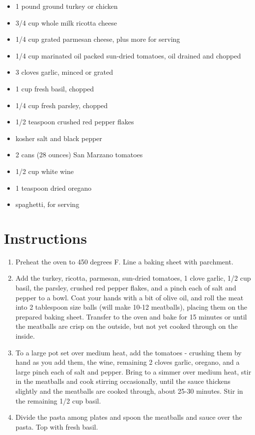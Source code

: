 \documentclass[
  letterpaper,
  DIV=11,
  numbers=noendperiod,
  titlepage=false]{scrreprt}
\providecommand{\tightlist}{%
  \setlength{\itemsep}{0pt}\setlength{\parskip}{0pt}}\usepackage{longtable,booktabs,array}
\begin{document}
\begin{itemize}
\tightlist
\item
  1 pound ground turkey or chicken
\item
  3/4 cup whole milk ricotta cheese
\item
  1/4 cup grated parmesan cheese, plus more for serving
\item
  1/4 cup marinated oil packed sun-dried tomatoes, oil drained and
  chopped
\item
  3 cloves garlic, minced or grated
\item
  1 cup fresh basil, chopped
\item
  1/4 cup fresh parsley, chopped
\item
  1/2 teaspoon crushed red pepper flakes
\item
  kosher salt and black pepper
\item
  2 cans (28 ounces) San Marzano tomatoes
\item
  1/2 cup white wine
\item
  1 teaspoon dried oregano
\item
  spaghetti, for serving
\end{itemize}

\section{Instructions}\label{instructions-22}

\begin{enumerate}
\def\labelenumi{\arabic{enumi}.}
\tightlist
\item
  Preheat the oven to 450 degrees F. Line a baking sheet with parchment.
\item
  Add the turkey, ricotta, parmesan, sun-dried tomatoes, 1 clove garlic,
  1/2 cup basil, the parsley, crushed red pepper flakes, and a pinch
  each of salt and pepper to a bowl. Coat your hands with a bit of olive
  oil, and roll the meat into 2 tablespoon size balls (will make 10-12
  meatballs), placing them on the prepared baking sheet. Transfer to the
  oven and bake for 15 minutes or until the meatballs are crisp on the
  outside, but not yet cooked through on the inside.
\item
  To a large pot set over medium heat, add the tomatoes - crushing them
  by hand as you add them, the wine, remaining 2 cloves garlic, oregano,
  and a large pinch each of salt and pepper. Bring to a simmer over
  medium heat, stir in the meatballs and cook stirring occasionally,
  until the sauce thickens slightly and the meatballs are cooked
  through, about 25-30 minutes. Stir in the remaining 1/2 cup basil.
\item
  Divide the pasta among plates and spoon the meatballs and sauce over
  the pasta. Top with fresh basil.
\end{enumerate}
\end{document}
